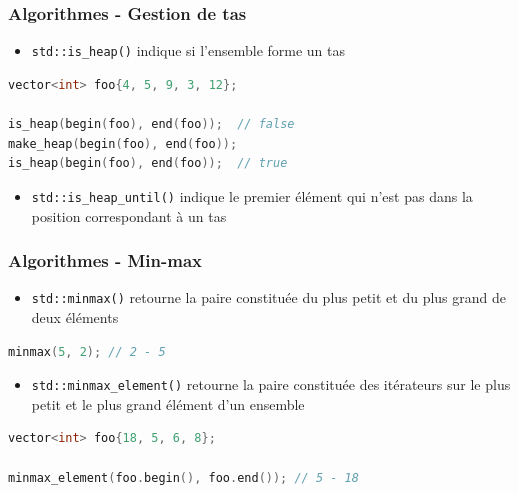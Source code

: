 \documentclass[C++.tex]{subfiles}
\begin{document}
\begin{frame}[fragile]
	\frametitle{Algorithmes - Gestion de \og tas\fg{}}
	\begin{itemize}
		\item \lstinline|std::is_heap()| indique si l'ensemble forme un tas
	\end{itemize}

	\begin{lstlisting}[language=C++]
vector<int> foo{4, 5, 9, 3, 12};

is_heap(begin(foo), end(foo));  // false
make_heap(begin(foo), end(foo));
is_heap(begin(foo), end(foo));  // true\end{lstlisting}

	\begin{itemize}
		\item \lstinline|std::is_heap_until()| indique le premier élément qui n'est pas dans la position correspondant à un tas 
	\end{itemize}
\end{frame}

\begin{frame}[fragile]
	\frametitle{Algorithmes - Min-max}
	\begin{itemize}
		\item \lstinline|std::minmax()| retourne la paire constituée du plus petit et du plus grand de deux éléments
	\end{itemize}

	\begin{lstlisting}[language=C++]
minmax(5, 2); // 2 - 5\end{lstlisting}

	\begin{itemize}
		\item \lstinline|std::minmax_element()| retourne la paire constituée des itérateurs sur le plus petit et le plus grand élément d'un ensemble
	\end{itemize}

	\begin{lstlisting}[language=C++]
vector<int> foo{18, 5, 6, 8};

minmax_element(foo.begin(), foo.end()); // 5 - 18\end{lstlisting}

\end{frame}
\end{document}
